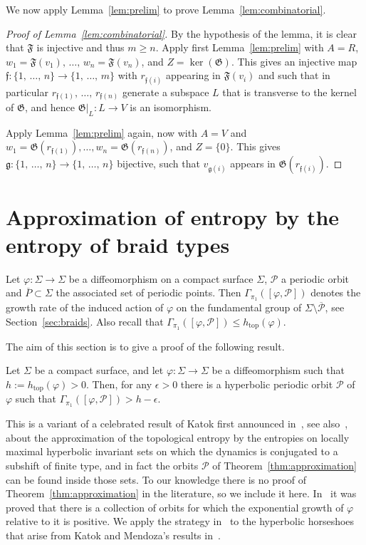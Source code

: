 \documentclass[AHL,Unicode,longabstracts,published]{cedram}
\newcommand{\topo}{\mathrm{top}}
\newcommand{\clP}{\mathcal{P}}
\newcommand{\fkg}{\mathfrak{g}}
\newcommand{\fkF}{\mathfrak{F}}
\newcommand{\fkG}{\mathfrak{G}}
\newcommand{\fkf}{\mathfrak{f}}
\newcommand{\topo}{\mathrm{top}}
\begin{document}
We now apply Lemma~\ref{lem:prelim} to prove Lemma~\ref{lem:combinatorial}.


\begin{proof}[Proof of Lemma~\ref{lem:combinatorial}]
By the hypothesis of the lemma, it is clear that $\fkF$ is injective and thus $m \geq n$. Apply first Lemma~\ref{lem:prelim} with $ A = R$, $w_1 = \fkF(v_1), \,\ldots,\, w_n = \fkF(v_n)$, and $Z = \ker(\fkG)$. This gives an injective map $\fkf: \{1,\, \ldots,\, n \} \to \{1, \,\ldots,\, m\}$ with $r_{\fkf(i)}$ appearing in $\fkF(v_i)$ and such that in particular $r_{\fkf(1)}, \,\ldots,\, r_{\fkf(n)}$ generate a subspace $L$ that is transverse to the kernel of $\fkG$, and hence $\fkG|_L: L \to V$ is an isomorphism.


Apply Lemma~\ref{lem:prelim} again, now with $A=V$ and $w_1 = \fkG(r_{\fkf(1)}), \ldots, w_n = \fkG(r_{\fkf(n)})$, and $Z = \{0\}$. This gives $\fkg:\{1,\, \ldots,\, n\} \to \{1, \,\ldots,\, n\}$ bijective, such that $v_{\fkg(i)}$ appears in $\fkG(r_{\fkf(i)})$.
\end{proof}

\section{Approximation of entropy by the entropy of braid types} \label{appendix:approx}

Let $\varphi: \Sigma \to \Sigma$ be a diffeomorphism on a compact surface $\Sigma$, $\clP$ a periodic orbit and $\overline{P}\subset \Sigma$ the associated set of periodic points. Then $\Gamma_{\pi_1}([\varphi, \clP])$ denotes the growth rate of the induced action of $\varphi$ on the fundamental group of $\Sigma \setminus \overline{\clP}$, see Section~\ref{sec:braids}. Also recall that $\Gamma_{\pi_1}([\varphi, \clP]) \leq h_{\topo}(\varphi)$.

The aim of this section is to give a proof of the following result.

\begin{theo}\label{thm:approximation}
Let $\Sigma$ be a compact surface, and let $\varphi: \Sigma\to \Sigma$ be a diffeomorphism such that $h:=h_{\topo}(\varphi)>0$. Then, for any $\epsilon>0$ there is a hyperbolic periodic orbit $\clP$ of $\varphi$ such that $\Gamma_{\pi_1}([\varphi,\clP])> h - \epsilon$.
\end{theo}



This is a variant of a celebrated result of Katok first announced in~\cite{Katok1984}, see also~\cite[Supplement]{Hasselblatt-Katok}, about the approximation of the topological entropy by the entropies on locally maximal hyperbolic invariant sets on which the dynamics is conjugated to a subshift of finite type, and in fact the orbits $\clP$ of Theorem~\ref{thm:approximation} can be found inside those sets. To our knowledge there is no proof of Theorem~\ref{thm:approximation} in the literature, so we include it here. In~\cite{FranksHandel1988} it was proved that there is a collection of orbits for which the exponential growth of $\varphi$ relative to it is positive. We apply the strategy in~\cite{FranksHandel1988} to the hyperbolic horseshoes that arise from Katok and Mendoza's results in~\cite[Supplement]{Hasselblatt-Katok}.
\end{document}
